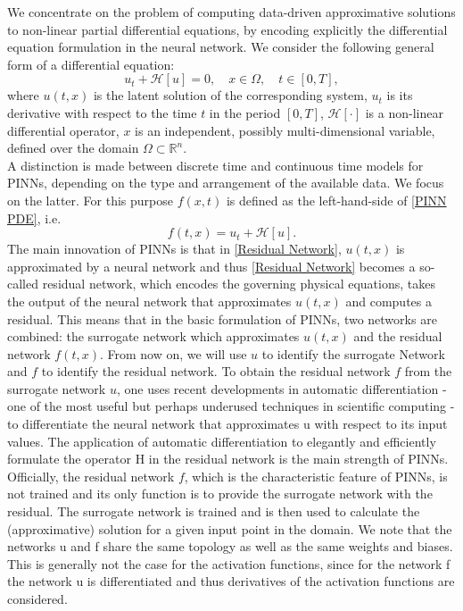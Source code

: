 We concentrate on the problem of computing data-driven approximative solutions to non-linear partial differential equations, by encoding explicitly the differential equation formulation in the neural network. We consider the following general form of a differential equation:
\begin{equation}
    \label{PINN PDE}
    u_t + \mathcal{H} \left[ u \right] = 0, \quad x \in \Omega, \quad t \in [0, T], 
\end{equation}
where $u(t,x)$ is the latent solution of the corresponding system, $u_t$ is its derivative with respect to the time $t$ in the period $\left[ 0, T \right]$, $\mathcal{H} \left[ \cdot \right]$ is a non-linear differential operator, $x$ is an independent, possibly multi-dimensional variable, defined over the domain $\Omega \subset \mathbb{R}^{n}$. \\
A distinction is made between discrete time and continuous time models for PINNs, depending on the type and arrangement of the available data. We focus on the latter. For this purpose $f(x,t)$ is defined as the left-hand-side of \cref{PINN PDE}, i.e.
\begin{equation}
    \label{Residual Network}
    f(t,x) = u_t + \mathcal{H} \left[ u \right].
\end{equation}
The main innovation of PINNs is that in \cref{Residual Network}, $u(t,x)$ is approximated by a neural network and thus \cref{Residual Network} becomes a so-called residual network, which encodes the governing physical equations, takes the output of the neural network that approximates $u(t,x)$ and computes a residual. This means that in the basic formulation of PINNs, two networks are combined: the surrogate network which approximates $u(t,x)$ and the residual network $f(t,x)$. From now on, we will use $u$ to identify the surrogate Network and $f$ to identify the residual network. To obtain the residual network $f$ from the surrogate network $u$, one uses recent developments in automatic differentiation - one of the most useful but perhaps underused techniques in scientific computing - to differentiate the neural network that approximates u with respect to its input values. The application of automatic differentiation to elegantly and efficiently formulate the operator H in the residual network is the main strength of PINNs. Officially, the residual network $f$, which is the characteristic feature of PINNs, is not trained and its only function is to provide the surrogate network with the residual. The surrogate network is trained and is then used to calculate the (approximative) solution for a given input point in the domain. We note that the networks u and f share the same topology as well as the same weights and biases. This is generally not the case for the activation functions, since for the network f the network u is differentiated and thus derivatives of the activation functions are considered. \\
